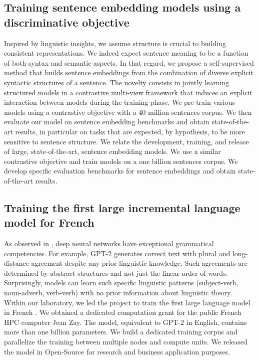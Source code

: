 \subsection{Training sentence embedding models using a discriminative objective}

Inspired by linguistic insights, we assume structure is crucial to building consistent representations. We indeed expect sentence meaning to be a function of both syntax and semantic aspects. In that regard, we propose a self-supervised method that builds sentence embeddings from the combination of diverse explicit syntactic structures of a sentence. The novelty consists in jointly learning structured models in a contrastive multi-view framework that induces an explicit interaction between models during the training phase. We pre-train various models using a contrastive objective with a 40 million sentences corpus. We then evaluate our model on sentence embedding benchmarks and obtain state-of-the-art results, in particular on tasks that are expected, by hypothesis, to be more sensitive to sentence structure. We relate the development, training, and release of large, state-of-the-art, sentence embedding models. We use a similar contrastive objective and train models on a one billion sentences corpus. We develop specific evaluation benchmarks for sentence embeddings and obtain state-of-the-art results.

\subsection{Training the first large incremental language model for French}

As observed in \textcite{linzen_2020}, deep neural networks have exceptional grammatical competencies. For example, GPT-2 generates correct text with plural and long-distance agreement despite any prior linguistic knowledge. Such agreements are determined by abstract structures and not just the linear order of words. Surprisingly, models can learn such specific linguistic patterns (subject-verb, noun-adverb, verb-verb) with no prior information about linguistic theory. Within our laboratory, we led the project to train the first large language model in French \parencite{simoulin_2021c}. We obtained a dedicated computation grant for the public French HPC computer Jean Zay. The model, equivalent to GPT-2 in English, contains more than one billion parameters. We build a dedicated training corpus and parallelize the training between multiple nodes and compute units. We released the model in Open-Source for research and business application purposes. 


